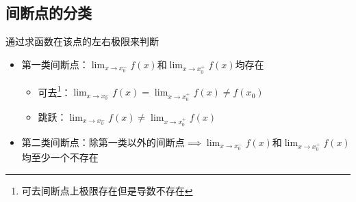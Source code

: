 \documentclass[12pt, a4paper, oneside, UTF8]{ctexbook}
\begin{document}
\begin{sloppypar}
    \subsection{间断点的分类}
    通过求函数在该点的左右极限来判断
    \begin{itemize}
        \item 第一类间断点：$\lim _ { x \rightarrow x _ { 0 } ^{-}} f ( x )$​ 和$\lim _ { x \rightarrow x _ { 0 }^ {+}} f ( x )$​ 均存在
              \begin{itemize}
                  \item 可去\footnote{可去间断点上极限存在但是导数不存在}：$\lim _ { x \rightarrow x_0 ^ { - } } f ( x ) = \lim _ { x \rightarrow x_0^{+} } f  ( x ) \neq f(x_0)$
                  \item 跳跃：$\lim _ { x \rightarrow x_0^{-} } f ( x ) \not= \lim _ { x \rightarrow x_0^{+} } f ( x )$
              \end{itemize}
        \item 第二类间断点：除第一类以外的间断点$\implies \lim _ { x \rightarrow x _ { 0 } ^{-}} f ( x )$和$\lim _ { x \rightarrow x _ { 0 }^ {+}} f ( x )$​ 均至少一个不存在
    \end{itemize}
    \ifx\allfiles\undefined
\end{sloppypar}
\end{document}

